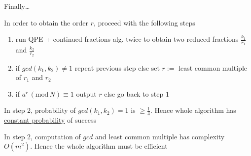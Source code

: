 \documentclass{beamer}
\begin{document}
\begin{frame}{Finally\dots}

        In order to obtain the order $r$, proceed with the following steps
        \begin{enumerate}
                \item run QPE + continued fractions alg. twice to obtain two
                        reduced fractions $\frac{k_1}{r_1}$ and
                        $\frac{k_2}{r_2}$
                \item if $gcd(k_1,k_2) \not = 1$ repeat previous step else set
                $r:=$ least common multiple of $r_1$ and $r_2$
                \item if $a^r \, (\mathrm{mod} \, N) \equiv 1$ 
                         output $r$ else go back to step $1$
        \end{enumerate}
       
        \pause
        In step 2, probability of $gcd(k_1,k_2) = 1$ is $\geq \frac{1}{4}$.
        Hence whole algorithm has \alert{\underline{constant probability}} of
        success
        
        In step 2, computation of $gcd$ and least common multiple has
        complexity $O(m^2)$. Hence the whole algorithm must be efficient
\end{frame}
\end{document}
